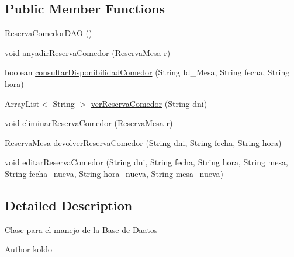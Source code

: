 \subsection*{Public Member Functions}
\begin{DoxyCompactItemize}
\item 
\mbox{\hyperlink{classes_1_1deusto_1_1spq_1_1biblioteca_1_1dao_1_1_reserva_comedor_d_a_o_ab7a8d66a69f0deb45309fc08ed21981b}{Reserva\+Comedor\+D\+AO}} ()
\item 
void \mbox{\hyperlink{classes_1_1deusto_1_1spq_1_1biblioteca_1_1dao_1_1_reserva_comedor_d_a_o_a00a9d306bae663d51886fb00f0838d45}{anyadir\+Reserva\+Comedor}} (\mbox{\hyperlink{classes_1_1deusto_1_1spq_1_1biblioteca_1_1data_1_1_reserva_mesa}{Reserva\+Mesa}} r)
\item 
boolean \mbox{\hyperlink{classes_1_1deusto_1_1spq_1_1biblioteca_1_1dao_1_1_reserva_comedor_d_a_o_adf9fa1cb08488112692797e7959b2ef8}{consultar\+Disponibilidad\+Comedor}} (String Id\+\_\+\+Mesa, String fecha, String hora)
\item 
Array\+List$<$ String $>$ \mbox{\hyperlink{classes_1_1deusto_1_1spq_1_1biblioteca_1_1dao_1_1_reserva_comedor_d_a_o_a4cac22c7d393f3994118317472f9ab95}{ver\+Reserva\+Comedor}} (String dni)
\item 
void \mbox{\hyperlink{classes_1_1deusto_1_1spq_1_1biblioteca_1_1dao_1_1_reserva_comedor_d_a_o_afb0004fc47c5ea34a1187d1f6433892f}{eliminar\+Reserva\+Comedor}} (\mbox{\hyperlink{classes_1_1deusto_1_1spq_1_1biblioteca_1_1data_1_1_reserva_mesa}{Reserva\+Mesa}} r)
\item 
\mbox{\hyperlink{classes_1_1deusto_1_1spq_1_1biblioteca_1_1data_1_1_reserva_mesa}{Reserva\+Mesa}} \mbox{\hyperlink{classes_1_1deusto_1_1spq_1_1biblioteca_1_1dao_1_1_reserva_comedor_d_a_o_aa8bb09a0de105a3b0d595fccd6f37d5b}{devolver\+Reserva\+Comedor}} (String dni, String fecha, String hora)
\item 
void \mbox{\hyperlink{classes_1_1deusto_1_1spq_1_1biblioteca_1_1dao_1_1_reserva_comedor_d_a_o_a61cbf6ed260e7a3ca7af26b6130fa054}{editar\+Reserva\+Comedor}} (String dni, String fecha, String hora, String mesa, String fecha\+\_\+nueva, String hora\+\_\+nueva, String mesa\+\_\+nueva)
\end{DoxyCompactItemize}


\subsection{Detailed Description}
Clase para el manejo de la Base de Daatos \begin{DoxyAuthor}{Author}
koldo 
\end{DoxyAuthor}


